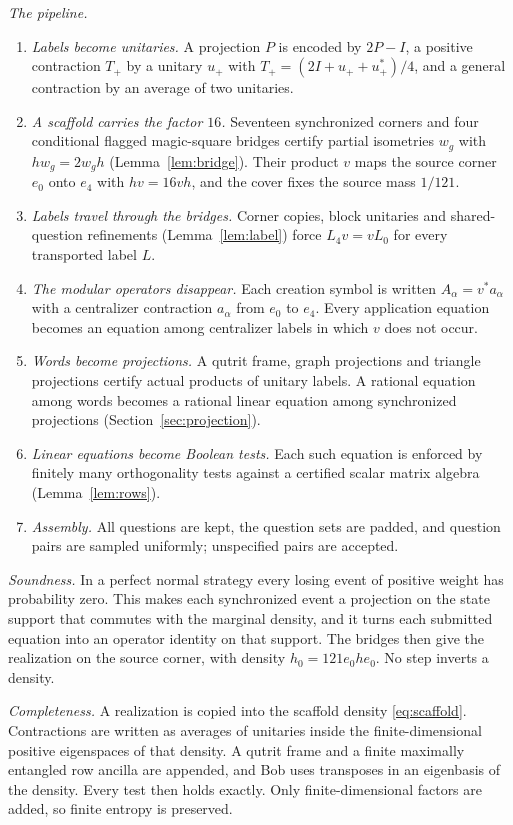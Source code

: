 \emph{The pipeline.}
\begin{enumerate}
\item \emph{Labels become unitaries.} A projection $P$ is encoded by $2P-I$, a positive contraction $T_+$ by a unitary $u_+$ with $T_+=(2I+u_++u_+^*)/4$, and a general contraction by an average of two unitaries.
\item \emph{A scaffold carries the factor $16$.} Seventeen synchronized corners and four conditional flagged magic-square bridges certify partial isometries $w_g$ with $hw_g=2w_gh$ (Lemma~\ref{lem:bridge}). Their product $v$ maps the source corner $e_0$ onto $e_4$ with $hv=16vh$, and the cover fixes the source mass $1/121$.
\item \emph{Labels travel through the bridges.} Corner copies, block unitaries and shared-question refinements (Lemma~\ref{lem:label}) force $L_4v=vL_0$ for every transported label $L$.
\item \emph{The modular operators disappear.} Each creation symbol is written $A_\alpha=v^*a_\alpha$ with a centralizer contraction $a_\alpha$ from $e_0$ to $e_4$. Every application equation becomes an equation among centralizer labels in which $v$ does not occur.
\item \emph{Words become projections.} A qutrit frame, graph projections and triangle projections certify actual products of unitary labels. A rational equation among words becomes a rational linear equation among synchronized projections (Section~\ref{sec:projection}).
\item \emph{Linear equations become Boolean tests.} Each such equation is enforced by finitely many orthogonality tests against a certified scalar matrix algebra (Lemma~\ref{lem:rows}).
\item \emph{Assembly.} All questions are kept, the question sets are padded, and question pairs are sampled uniformly; unspecified pairs are accepted.
\end{enumerate}

\emph{Soundness.} In a perfect normal strategy every losing event of positive weight has probability zero. This makes each synchronized event a projection on the state support that commutes with the marginal density, and it turns each submitted equation into an operator identity on that support. The bridges then give the realization on the source corner, with density $h_0=121e_0he_0$. No step inverts a density.

\emph{Completeness.} A realization is copied into the scaffold density \eqref{eq:scaffold}. Contractions are written as averages of unitaries inside the finite-dimensional positive eigenspaces of that density. A qutrit frame and a finite maximally entangled row ancilla are appended, and Bob uses transposes in an eigenbasis of the density. Every test then holds exactly. Only finite-dimensional factors are added, so finite entropy is preserved.

